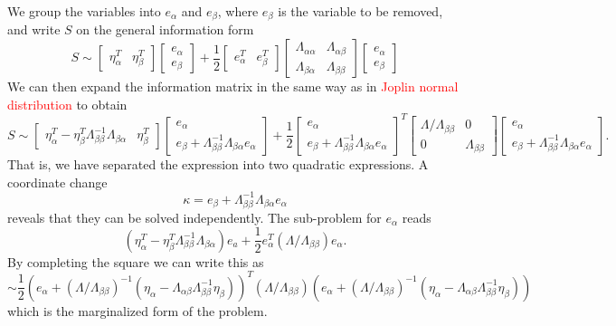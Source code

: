 We group the variables into $e_\alpha$ and $e_\beta$, where $e_\beta$ is the variable to be removed, and write $S$ on the general information form
$$
  S \sim \begin{bmatrix}
    \eta_\alpha^T & \eta_\beta^T
  \end{bmatrix}   \begin{bmatrix}
    e_\alpha \\ e_\beta
  \end{bmatrix} + \frac{1}{2}\begin{bmatrix}
    e_\alpha^T & e_\beta^T
  \end{bmatrix} \begin{bmatrix}
    \Lambda_{\alpha \alpha} & \Lambda_{\alpha \beta} \\ \Lambda_{\beta \alpha} & \Lambda_{\beta \beta}
  \end{bmatrix} \begin{bmatrix}
    e_\alpha \\ e_\beta
  \end{bmatrix}
$$
We can then expand the information matrix in the same way as in \textcolor{red}{Joplin normal distribution} to obtain
$$
  S \sim \begin{bmatrix}
    \eta_\alpha^T - \eta_\beta^T \Lambda_{\beta \beta}^{-1} \Lambda_{\beta \alpha} & \eta_\beta^T
  \end{bmatrix}   \begin{bmatrix}
    e_\alpha \\ e_\beta + \Lambda_{\beta\beta}^{-1} \Lambda_{\beta \alpha} e_\alpha
  \end{bmatrix} + \frac{1}{2}\begin{bmatrix}
    e_\alpha \\ e_\beta + \Lambda_{\beta\beta}^{-1} \Lambda_{\beta \alpha} e_\alpha
  \end{bmatrix}^T \begin{bmatrix}
    \Lambda/\Lambda_{\beta \beta} & 0 \\ 0 & \Lambda_{\beta \beta}
  \end{bmatrix} \begin{bmatrix}
    e_\alpha \\ e_\beta + \Lambda_{\beta\beta}^{-1} \Lambda_{\beta \alpha} e_\alpha
  \end{bmatrix}.
$$
That is, we have separated the expression into two quadratic expressions. A coordinate change $$\kappa = e_\beta + \Lambda_{\beta\beta}^{-1} \Lambda_{\beta \alpha} e_\alpha$$ reveals that they can be solved independently. The sub-problem for $e_\alpha$ reads
$$
  \left( \eta_\alpha^T - \eta_\beta^T \Lambda_{\beta\beta}^{-1} \Lambda_{\beta \alpha} \right) e_a + \frac{1}{2} e_\alpha^T (\Lambda/\Lambda_{\beta\beta}) e_\alpha.
$$
By completing the square we can write this as
$$
  \sim \frac{1}{2} \left( e_\alpha + (\Lambda/\Lambda_{\beta \beta})^{-1} \left( \eta_\alpha -  \Lambda_{\alpha \beta} \Lambda_{\beta \beta}^{-1} \eta_\beta \right) \right)^T (\Lambda/\Lambda_{\beta \beta})   \left( e_\alpha + (\Lambda/\Lambda_{\beta \beta})^{-1} \left( \eta_\alpha - \Lambda_{\alpha \beta} \Lambda_{\beta \beta}^{-1} \eta_\beta \right) \right)
$$
which is the marginalized form of the problem.


